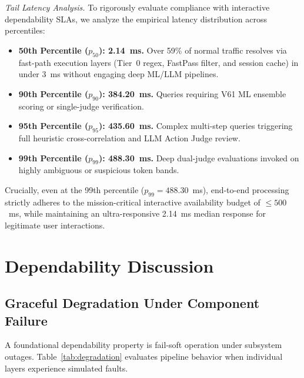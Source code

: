 \documentclass[conference]{IEEEtran}
\begin{document}
\textit{Tail Latency Analysis.} To rigorously evaluate compliance with interactive dependability SLAs, we analyze the empirical latency distribution across percentiles:
\begin{itemize}[leftmargin=*]
    \item \textbf{50th Percentile ($p_{50}$): 2.14~ms.} Over 59\% of normal traffic resolves via fast-path execution layers (Tier~0 regex, FastPass filter, and session cache) in under 3~ms without engaging deep ML/LLM pipelines.
    \item \textbf{90th Percentile ($p_{90}$): 384.20~ms.} Queries requiring V61 ML ensemble scoring or single-judge verification.
    \item \textbf{95th Percentile ($p_{95}$): 435.60~ms.} Complex multi-step queries triggering full heuristic cross-correlation and LLM Action Judge review.
    \item \textbf{99th Percentile ($p_{99}$): 488.30~ms.} Deep dual-judge evaluations invoked on highly ambiguous or suspicious token bands.
\end{itemize}
Crucially, even at the 99th percentile ($p_{99} = 488.30$~ms), end-to-end processing strictly adheres to the mission-critical interactive availability budget of $\leq 500$~ms, while maintaining an ultra-responsive 2.14~ms median response for legitimate user interactions.

\section{Dependability Discussion}

\subsection{Graceful Degradation Under Component Failure}
A foundational dependability property is fail-soft operation under subsystem outages. Table~\ref{tab:degradation} evaluates pipeline behavior when individual layers experience simulated faults.

\begin{table}[t]
\caption{Graceful Degradation Under Subsystem Failures}
\label{tab:degradation}
\centering
{}
\end{table}
\end{document}
